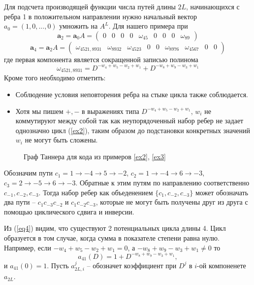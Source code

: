 \documentclass[specification,annotation,times]{itmo-student-thesis}
\newcommand{\inputTikZ}[1]{}
\newcommand{\bs}[1]{\ensuremath{\boldsymbol{#1}}}
\begin{document}
Для подсчета производящей функции числа путей длины $2L$, начинающихся с ребра 1 в положительном направлении
нужно начальный вектор $a_0=(1,0,...,0)$ умножить на $A^L$. Для нашего примера при
 \begin{equation}
\bs a_2=\bs a_0 A =
\begin{pmatrix}
     0    & 0 &    0 &    0 &    \omega_{45}   &  0 &    0 &    0 &    \omega_{89}
 \end{pmatrix}
\end{equation} 
\begin{equation}\label{eq4}
 \bs a_4=\bs a_2A=
 \begin{pmatrix}    
    \omega_{4521,8931}  &\omega_{8932} & \omega_{4523 } &0 &    0 &    \omega_{8976}   & \omega_{4567 }&    0 &    0 
 \end{pmatrix}
\end{equation} 
где первая компонента является сокращенной записью полинома
\[
 \omega_{4521,8931}=D^{-w_4+w_5-w_2+w_1}+D^{-w_8+w_9-w_3+w_1}
\]
Кроме того необходимо отметить:
\begin{itemize}
\item 
Соблюдение условия неповторения ребра на стыке цикла также соблюдается.
\item
Хотя мы пишем $+, -$  в выражениях типа $D^{-w_4+w_5-w_2+w_1}$,
$w_i$ не коммутируют между собой так как неупорядоченный набор ребер не задает однозначно цикл (\ref{ex2}),
 таким образом до подстановки конкретных значений $w_i$ не могут быть сложены.
\end{itemize}

\begin{figure}[!h]
  \centering
  \inputTikZ{ex_graph2}
   \caption{Граф Таннера для кода из примеров \ref{ex2}, \ref{ex3}}
  \label{fig1}
\end{figure}

\begin{example} \label{ex2}
  Обозначим пути $c_1=1 \to -4 \to 5 \to -2$, $c_2=1 \to -4 \to 6 \to -3$, $c_3=2 \to -5 \to 6 \to -3$.
 Обратные к этим путям по направлению соответственно $c_{-1}, c_{-2}, c_{-3}$.
 Тогда набор ребер как объеденением $\{c_1,c_{-2},c_{-3}\}$ может обозначать два пути -- $c_1c_{-3}c_{-2}$ и 
$c_1c_{-2}c_{-3}$, которые не могут быть получены друг из друга с помощью циклического сдвига и инверсии.
\end{example}

Из (\ref{eq4}) видим, что существуют 2 потенциальных цикла длины 4. 
Цикл образуется в том случае, когда сумма в показателе степени равна нулю. 
Например, если $-w_4+w_5-w_2+w_1=0$, а  $-w_8+w_9-w_3+w_1\neq 0$  то 
\[
a_{41}(D)=1+D^{-w_8+w_9-w_3+w_1}, 
\]
и $a_{41}(0)=1$.
Пусть $a_{2L,i}^{j}$ -- обозначет коэффициент при $D^j$ в $i$-ой компоненете $a_{2L}$.
\end{document}
